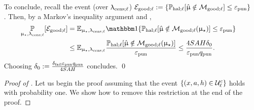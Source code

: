 To conclude, recall the event (over $\uplambda_{\mathrm{cens};\ell}$) $\mathcal{E}_{\mathrm{good};\ell} := \{\operatorname{\mathbb{P}}_{\mathrm{hal};\ell}[\hat{\upmu} \notin \mathcal{M}_{\mathrm{good};\ell}] \le \varepsilon_{\mathrm{pun}}\}$. Then, by a Markov's inequality argument and ,
\begin{align*}
\Prop_{\modst,\ledcensl}[\Egoodl] &= \Exp_{\modst,\ledcensl}\ind\{\Prhall[\modvarhat \notin \modgoodl(\modst)] \le \epspunish\}\\
&\le \Exp_{\modst,\ledcensl}\frac{\Prhall[\modvarhat \notin \modgoodl(\modst)]}{\epspunish} \le \frac{4SAH \delta_0}{\epspunish \qpunish}.
\end{align*}
 Choosing $\delta_0 := \frac{\delta_{\mathrm{fail}}\varepsilon_{\mathrm{pun}} q_{\mathrm{pun}}}{4SAH}$ concludes.
\qed




\begin{proof}[Proof of ] Let us begin the proof assuming that the event $\{(x,a,h) \in \mathcal{U}_{\ell}^c\}$ holds with probability one. We show how to remove this restriction at the end of the proof.


\end{proof}
